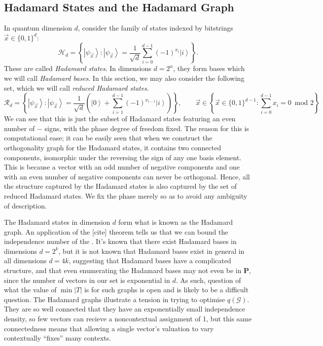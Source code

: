 \documentclass{amsart}
\theoremstyle{definition}
\newcommand{\ket}[1]{{\left\vert{#1}\right\rangle}}
\begin{document}

\subsection{Hadamard States and the Hadamard Graph}

In quantum dimension $d$, consider the family of states indexed by bitstrings $\vec{x}\in\{0,1\}^d$:
\begin{equation}
\mathcal{H}_d=\left\{ \ket{\psi_{\vec{x}}}:\ket{\psi_{\vec{x}}} = \frac{1}{\sqrt{d}}\sum_{i=0}^{d-1}(-1)^{x_i}\ket{i}  \right\}.
\end{equation}
These are called \emph{Hadamard states}. In dimensions $d=2^n$, they form bases which we will call \emph{Hadamard bases}. In this section, we may also consider the following set, which we will call \emph{reduced Hadamard states}.
\begin{equation}
\mathcal{R}_d=\left\{ \ket{\psi_{\vec{x}}}:\ket{\psi_{\vec{x}}} = \frac{1}{\sqrt{d}}\left(\ket{0}+\sum_{i=1}^{d-1}(-1)^{x_{i-1}}\ket{i}  \right)\right\}, \qquad\vec{x}\in\left\{\vec{x}\in\{0,1\}^{d-1}:\sum_{i=0}^{d-1} x_i =0 \enspace \mbox{mod 2}\right\}
\end{equation}
We can see that this is just the subset of Hadamard states featuring an even number of $-$ signs, with the phase degree of freedom fixed. The reason for this is computational ease; it can be easily seen that when we construct the orthogonality graph for the Hadamard states, it contains two connected components, isomorphic under the reversing the sign of any one basis element. This is because a vector with an odd number of negative components and one with an even number of negative components can never be orthogonal. Hence, all the structure captured by the Hadamard states is also captured by the set of reduced Hadamard states. We fix the phase merely so as to avoid any ambiguity of description.

The Hadamard states in dimension $d$ form what is known as the Hadamard graph. An application of the [cite] theorem tells us that we can bound the independence number of the . It's known that there exist Hadamard bases in dimensions $d=2^k$, but it is not known that Hadamard bases exist in general in all dimensions $d=4k$, suggesting that Hadamard bases have a complicated structure, and that even enumerating the Hadamard bases may not even be in \textbf{P}, since the number of vectors in our set is exponential in $d$. As such, question of what the value of $\min|T|$  is for such graphs is open and is likely to be a difficult question. The Hadamard graphs illustrate a tension in trying to optimise $q(\mathcal{G})$. They are so well connected that they have an exponentially small independence density, so few vectors can recieve a noncontextual assignment of 1, but this same connectedness means that allowing a single vector's valuation to vary contextually ``fixes'' many contexts.
\end{document}
